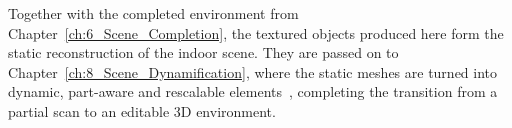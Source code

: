 Together with the completed environment from Chapter~\ref{ch:6_Scene_Completion}, the textured objects produced here form the static reconstruction of the indoor scene. They are passed on to Chapter~\ref{ch:8_Scene_Dynamification}, where the static meshes are turned into dynamic, part-aware and rescalable elements~\cite{vermandere_adaptive_2026}, completing the transition from a partial scan to an editable 3D environment.


\cleardoublepage